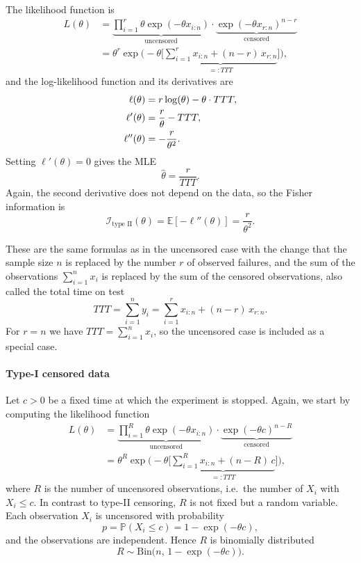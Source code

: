 The likelihood function is
\begin{align*}
	L(\theta) 
	&=
	\underbrace{\prod_{i=1}^r \theta \exp(- \theta x_{i:n})}_{\text{uncensored}} \cdot \underbrace{\exp(- \theta x_{r:n})^{n-r}}_{\text{censored}} \\
	&=
	\theta^r \exp \Bigg( - \theta \bigg[ \underbrace{\sum_{i = 1}^r x_{i:n} + (n-r)\, x_{r:n}}_{=:TTT} \bigg] \Bigg),
\end{align*}
and the log-likelihood function and its derivatives are
\begin{align}
	\ell(\theta) &= r \log (\theta) - \theta \cdot TTT, \label{log likelihood function type II censored} \\
	\ell'(\theta) &= \frac{r}{\theta} - TTT, \notag \\
	\ell''(\theta) &= - \frac{r}{\theta^2}. \notag
\end{align}
Setting $\ell'(\theta) = 0$ gives the MLE
\begin{equation}  \label{MLE for type II censored}
	\hat\theta = \frac{r}{TTT}.
\end{equation}
Again, the second derivative does not depend on the data, so the Fisher information is
\begin{equation} \label{fisher info exp type II}
	\mathcal{I}_{\text{type II}}(\theta) = \mathbb{E}\left[ - \ell''(\theta) \right] = \frac{r}{\theta^2}.
\end{equation}

These are the same formulas as in the uncensored case with the change that
the sample size $n$ is replaced by the number $r$ of observed failures, and the sum of the observations $\sum_{i=1}^n x_i$ is replaced by the sum of the censored observations, also called the total time on test
\[
TTT = \sum_{i = 1}^n y_i = \sum_{i = 1}^r x_{i:n} + (n-r)\, x_{r:n}.
\]
For $r = n$ we have $TTT = \sum_{i=1}^n x_i$, so the uncensored case is included as a special case.


\paragraph{Type-I censored data}

Let $c > 0$ be a fixed time at which the experiment is stopped.
Again, we start by computing the likelihood function
\begin{align*}
	L(\theta) 
	&=
	\underbrace{\prod_{i=1}^R \theta \exp(- \theta x_{i:n})}_{\text{uncensored}} \cdot \underbrace{\exp(- \theta c)^{n-R}}_{\text{censored}} \\
	&=
	\theta^R \exp \Bigg( - \theta \bigg[ \underbrace{\sum_{i = 1}^R x_{i:n} + (n-R)\,c}_{=:TTT} \bigg] \Bigg),
\end{align*}
where $R$ is the number of uncensored observations, i.e.\ the number of $X_i$ with $X_i \leq c$.
In contrast to type-II censoring, $R$ is not fixed but a random variable.
Each observation $X_i$ is uncensored with probability
\[
p = \mathbb{P}(X_i \leq c) = 1 - \exp(-\theta c),
\]
and the observations are independent. 
Hence $R$ is binomially distributed
\[
R \sim \text{Bin}\big(n,\, 1 - \exp(-\theta c)\big).
\]

